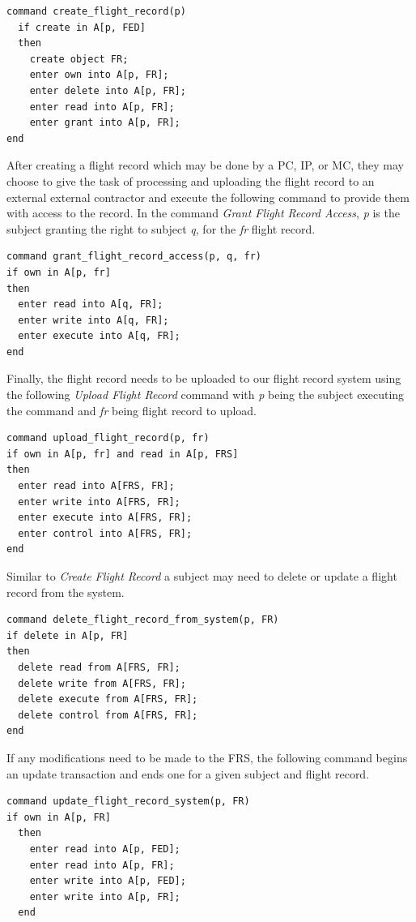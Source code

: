\documentclass[10pt,journal,compsoc]{IEEEtran}
\begin{document}
\begin{lstlisting}
command create_flight_record(p)
  if create in A[p, FED]
  then
    create object FR;
    enter own into A[p, FR];
    enter delete into A[p, FR];
    enter read into A[p, FR];
    enter grant into A[p, FR];
end
\end{lstlisting}

After creating a flight record which may be done by a PC, IP, or MC, they may choose to give the task of processing and uploading the flight record to an external external contractor and execute the following command to provide them with access to the record. 
In the command \textit{Grant Flight Record Access}, \textit{p} is the subject granting the right to subject \textit{q}, for the \textit{fr} flight record.

\begin{lstlisting}
command grant_flight_record_access(p, q, fr)
if own in A[p, fr]
then
  enter read into A[q, FR];
  enter write into A[q, FR];
  enter execute into A[q, FR];
end
\end{lstlisting}  

Finally, the flight record needs to be uploaded to our flight record system using the following \textit{Upload Flight Record} command with \textit{p} being the subject executing the command and \textit{fr} being flight record to upload.

\begin{lstlisting}
command upload_flight_record(p, fr)
if own in A[p, fr] and read in A[p, FRS]
then
  enter read into A[FRS, FR];
  enter write into A[FRS, FR];
  enter execute into A[FRS, FR];
  enter control into A[FRS, FR];
end
\end{lstlisting}

Similar to \textit{Create Flight Record} a subject may need to delete or update a flight record from the system. 

\begin{lstlisting}
command delete_flight_record_from_system(p, FR)
if delete in A[p, FR]
then
  delete read from A[FRS, FR];
  delete write from A[FRS, FR];
  delete execute from A[FRS, FR];
  delete control from A[FRS, FR];
end
\end{lstlisting}

If any modifications need to be made to the FRS, the following command begins an update transaction and ends one for a given subject and flight record. 

\begin{lstlisting}
command update_flight_record_system(p, FR)
if own in A[p, FR]
  then
    enter read into A[p, FED];
    enter read into A[p, FR];
    enter write into A[p, FED];
    enter write into A[p, FR];
  end
\end{lstlisting}
\end{document}
